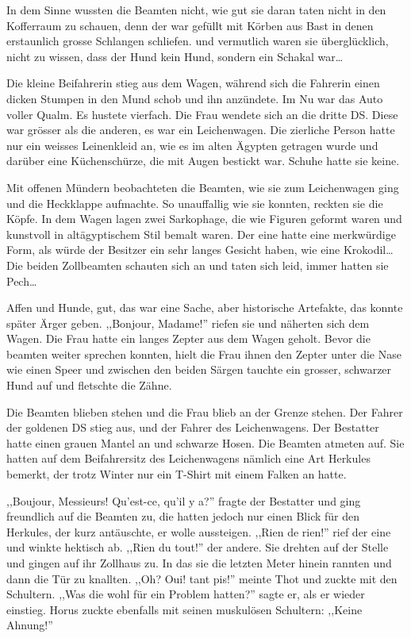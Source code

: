  In dem Sinne wussten die Beamten nicht, wie gut sie daran taten nicht in den Kofferraum zu schauen, denn der war gefüllt mit Körben aus Bast in denen erstaunlich grosse Schlangen schliefen. und vermutlich waren sie überglücklich, nicht zu wissen, dass der Hund kein Hund, sondern ein Schakal war\dots
 
Die kleine Beifahrerin stieg aus dem Wagen, während sich die Fahrerin einen dicken Stumpen in den Mund schob und ihn anzündete. Im Nu war das Auto voller Qualm. Es hustete vierfach. Die Frau wendete sich an die dritte DS. Diese war grösser als die anderen, es war ein Leichenwagen. Die zierliche Person hatte nur ein weisses Leinenkleid an, wie es im alten Ägypten getragen wurde und darüber eine Küchenschürze, die mit Augen bestickt war. Schuhe hatte sie keine.

Mit offenen Mündern beobachteten die Beamten, wie sie zum Leichenwagen ging und die Heckklappe aufmachte. So unauffallig wie sie konnten, reckten sie die Köpfe. In dem Wagen lagen zwei Sarkophage, die wie Figuren geformt waren und kunstvoll in altägyptischem Stil bemalt waren. Der eine hatte eine merkwürdige Form, als würde der Besitzer ein sehr langes Gesicht haben, wie eine Krokodil\dots Die beiden Zollbeamten schauten sich an und taten sich leid, immer hatten sie Pech\dots

Affen und Hunde, gut, das war eine Sache, aber historische Artefakte, das konnte später Ärger geben. ,,Bonjour, Madame!'' riefen sie und näherten sich dem Wagen. Die Frau hatte ein langes Zepter aus dem Wagen geholt. Bevor die beamten weiter sprechen konnten, hielt die Frau ihnen den Zepter unter die Nase wie einen Speer und zwischen den beiden Särgen tauchte ein grosser, schwarzer Hund auf und fletschte die Zähne.

Die Beamten blieben stehen und die Frau blieb an der Grenze stehen. Der Fahrer der goldenen DS stieg aus, und der Fahrer des Leichenwagens. Der Bestatter hatte einen grauen Mantel an und schwarze Hosen. Die Beamten atmeten auf. Sie hatten auf dem Beifahrersitz des Leichenwagens nämlich eine Art Herkules bemerkt, der trotz Winter nur ein T-Shirt mit einem Falken an hatte. 

,,Boujour, Messieurs! Qu'est-ce, qu'il y a?'' fragte der Bestatter und ging freundlich auf die Beamten zu, die hatten jedoch nur einen Blick für den Herkules, der kurz antäuschte, er wolle aussteigen. ,,Rien de rien!'' rief der eine und winkte hektisch ab. ,,Rien du tout!'' der andere. Sie drehten auf der Stelle und gingen auf ihr Zollhaus zu. In das sie die letzten Meter hinein rannten und dann die Tür zu knallten. ,,Oh? Oui! tant pis!'' meinte Thot und zuckte mit den Schultern. ,,Was die wohl für ein Problem hatten?'' sagte er, als er wieder einstieg. Horus zuckte ebenfalls mit seinen muskulösen Schultern: ,,Keine Ahnung!'' 

